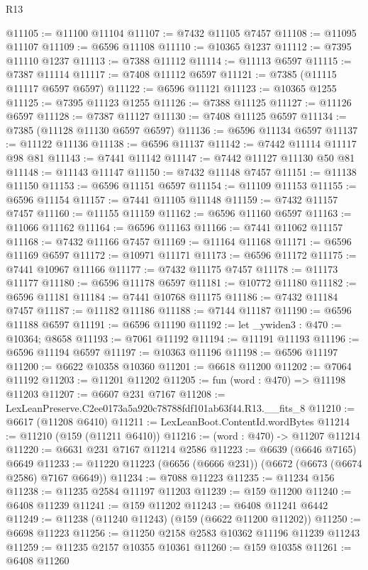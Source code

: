 \begin{lexlean}{R13}
\begin{coremodule}
@11105 := @11100 @11104
@11107 := @7432 @11105 @7457
@11108 := @11095 @11107
@11109 := @6596 @11108
@11110 := @10365 @1237
@11112 := @7395 @11110 @1237
@11113 := @7388 @11112
@11114 := @11113 @6597
@11115 := @7387 @11114
@11117 := @7408 @11112 @6597
@11121 := @7385 (@11115 @11117 @6597 @6597)
@11122 := @6596 @11121
@11123 := @10365 @1255
@11125 := @7395 @11123 @1255
@11126 := @7388 @11125
@11127 := @11126 @6597
@11128 := @7387 @11127
@11130 := @7408 @11125 @6597
@11134 := @7385 (@11128 @11130 @6597 @6597)
@11136 := @6596 @11134 @6597
@11137 := @11122 @11136
@11138 := @6596 @11137
@11142 := @7442 @11114 @11117 @98 @81
@11143 := @7441 @11142
@11147 := @7442 @11127 @11130 @50 @81
@11148 := @11143 @11147
@11150 := @7432 @11148 @7457
@11151 := @11138 @11150
@11153 := @6596 @11151 @6597
@11154 := @11109 @11153
@11155 := @6596 @11154
@11157 := @7441 @11105 @11148
@11159 := @7432 @11157 @7457
@11160 := @11155 @11159
@11162 := @6596 @11160 @6597
@11163 := @11066 @11162
@11164 := @6596 @11163
@11166 := @7441 @11062 @11157
@11168 := @7432 @11166 @7457
@11169 := @11164 @11168
@11171 := @6596 @11169 @6597
@11172 := @10971 @11171
@11173 := @6596 @11172
@11175 := @7441 @10967 @11166
@11177 := @7432 @11175 @7457
@11178 := @11173 @11177
@11180 := @6596 @11178 @6597
@11181 := @10772 @11180
@11182 := @6596 @11181
@11184 := @7441 @10768 @11175
@11186 := @7432 @11184 @7457
@11187 := @11182 @11186
@11188 := @7144 @11187
@11190 := @6596 @11188 @6597
@11191 := @6596 @11190
@11192 := let _ywiden3 : @470 := @10364; @8658
@11193 := @7061 @11192
@11194 := @11191 @11193
@11196 := @6596 @11194 @6597
@11197 := @10363 @11196
@11198 := @6596 @11197
@11200 := @6622 @10358 @10360
@11201 := @6618 @11200
@11202 := @7064 @11192
@11203 := @11201 @11202
@11205 := fun (word : @470) => @11198 @11203
@11207 := @6607 @231 @7167
@11208 := LexLeanPreserve.C2ee0173a5a920c78788fdf101ab63f44.R13.__fits_8
@11210 := @6617 (@11208 @6410)
@11211 := LexLeanBoot.ContentId.wordBytes
@11214 := @11210 (@159 (@11211 @6410))
@11216 := (word : @470) -> @11207 @11214
@11220 := @6631 @231 @7167 @11214 @2586
@11223 := @6639 (@6646 @7165) @6649
@11233 := @11220 @11223 (@6656 (@6666 @231)) (@6672 (@6673 (@6674 @2586) @7167 @6649))
@11234 := @7088 @11223
@11235 := @11234 @156
@11238 := @11235 @2584 @11197 @11203
@11239 := @159 @11200
@11240 := @6408 @11239
@11241 := @159 @11202
@11243 := @6408 @11241 @6442
@11249 := @11238 (@11240 @11243) (@159 (@6622 @11200 @11202))
@11250 := @6698 @11223
@11256 := @11250 @2158 @2583 @10362 @11196 @11239 @11243
@11259 := @11235 @2157 @10355 @10361
@11260 := @159 @10358
@11261 := @6408 @11260

\end{coremodule}
\end{lexlean}
